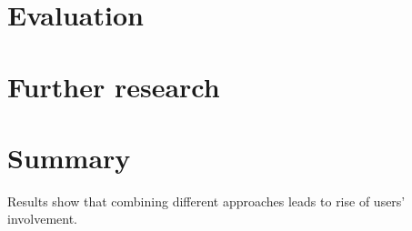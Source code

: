 \documentclass{article}
\begin{document}
    \section{Evaluation}
    \label{sec:evaluation}

    \section{Further research}
    \label{sec:further}

    \section{Summary}
    \label{sec:summary}

        Results show that combining different approaches leads to rise of users' involvement.

        

    
      
\end{document}
